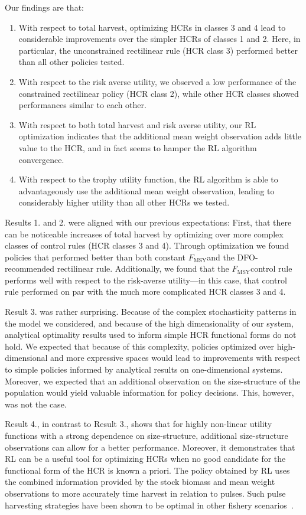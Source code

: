 \documentclass[floatfix,nofootinbib,longbibliography,notitlepage]{revtex4-2}
\def\textfmsy{$F_{\text{MSY}}$}
\begin{document}
Our findings are that:
\begin{enumerate}
\item With respect to total harvest, optimizing HCRs in classes 3 and 4 lead to considerable improvements over the simpler HCRs of classes 1 and 2. Here, in particular, the unconstrained rectilinear rule (HCR class 3) performed better than all other policies tested.
\item With respect to the risk averse utility, we observed a low performance of the constrained rectilinear policy (HCR class 2), while other HCR classes showed performances similar to each other.
\item With respect to both total harvest and risk averse utility, our RL optimization indicates that the additional mean weight observation adds little value to the HCR, and in fact seems to hamper the RL algorithm convergence. 
\item With respect to the trophy utility function, the RL algorithm is able to advantageously use the additional mean weight observation, leading to considerably higher utility than all other HCRs we tested. 
\end{enumerate}

Results 1. and 2. were aligned with our previous expectations: 
First, that there can be noticeable increases of total harvest by optimizing over more complex classes of control rules (HCR classes 3 and 4).
Through optimization we found policies that performed better than both constant \textfmsy and the DFO-recommended rectilinear rule. 
Additionally, we found that the \textfmsy control rule performs well with respect to the risk-averse utility—in this case, that control rule performed on par with the much more complicated HCR classes 3 and 4. 

Result 3. was rather surprising. 
Because of the complex stochasticity patterns in the model we considered, and because of the high dimensionality of our system, analytical optimality results used to inform simple HCR functional forms do not hold. 
We expected that because of this complexity, policies optimized over high-dimensional and more expressive spaces would lead to improvements with respect to simple policies informed by analytical results on one-dimensional systems. 
Moreover, we expected that an additional observation on the size-structure of the population would yield valuable information for policy decisions. 
This, however, was not the case.

Result 4., in contrast to Result 3., shows that for highly non-linear utility functions with a strong dependence on size-structure, additional size-structure observations can allow for a better performance. 
Moreover, it demonstrates that RL can be a useful tool for optimizing HCRs when no good candidate for the functional form of the HCR is known a priori. 
The policy obtained by RL uses the combined information provided by the stock biomass and mean weight observations to more accurately time harvest in relation to pulses. 
Such pulse harvesting strategies have been shown to be optimal in other fishery scenarios~\cite{botsford1981,darocha2013}.
\end{document}
